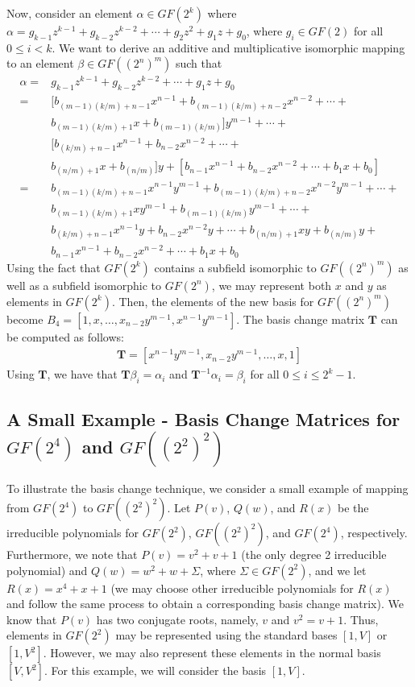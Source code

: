 Now, consider an element $\alpha \in GF(2^k)$ where $\alpha = g_{k-1}z^{k-1} + g_{k-2}z^{k-2} + \dotsb + g_2z^2 + g_1z + g_0$, where $g_i \in GF(2)$ for all $0 \leq i < k$. We want to derive an additive and multiplicative isomorphic mapping to an element $\beta \in GF((2^n)^m)$ such that
\begin{align*}
\alpha = & g_{k-1}z^{k-1} + g_{k-2}z^{k-2} + \dotsb + g_1z + g_0 \\
= & [b_{(m-1)(k/m) + n-1}x^{n-1} + b_{(m-1)(k/m) + n-2}x^{n-2} + \dotsb + \\
& b_{(m-1)(k/m) + 1}x + b_{(m-1)(k/m)}]y^{m-1} + \dotsb + \\
& [b_{(k/m) + n-1}x^{n-1} + b_{n-2}x^{n-2} + \dotsb + \\
& b_{(n/m) + 1}x + b_{(n/m)}]y + [b_{n-1}x^{n-1} + b_{n-2}x^{n-2} + \dotsb + b_{1}x + b_{0}] \\
= & b_{(m-1)(k/m) + n-1}x^{n-1}y^{m-1} + b_{(m-1)(k/m) + n-2}x^{n-2}y^{m-1} + \dotsb + \\
& b_{(m-1)(k/m) + 1}xy^{m-1} + b_{(m-1)(k/m)}y^{m-1} + \dotsb + \\
& b_{(k/m) + n-1}x^{n-1}y + b_{n-2}x^{n-2}y + \dotsb + b_{(n/m) + 1}xy + b_{(n/m)}y + \\
& b_{n-1}x^{n-1} + b_{n-2}x^{n-2} + \dotsb + b_{1}x + b_{0}
\end{align*}
Using the fact that $GF(2^k)$ contains a subfield isomorphic to $GF((2^n)^m)$ as well as a subfield isomorphic to $GF(2^n)$, we may represent both $x$ and $y$ as elements in $GF(2^k)$. Then, the elements of the new basis for $GF((2^n)^m)$ become $B_4 = [1,x,\dots,x_{n-2}y^{m-1},x^{n-1}y^{m-1}]$. The basis change matrix $\mathbf{T}$ can be computed as follows:
\begin{align*}
\mathbf{T} = [x^{n-1}y^{m-1}, x_{n-2}y^{m-1}, \dots, x, 1]
\end{align*}
Using $\mathbf{T}$, we have that $\mathbf{T}\beta_i = \alpha_i$ and $\mathbf{T}^{-1}\alpha_i = \beta_i$ for all $0 \leq i \leq 2^k - 1$.

\subsection{A Small Example - Basis Change Matrices for $GF(2^4)$ and $GF((2^2)^2)$}
To illustrate the basis change technique, we consider a small example of mapping from $GF(2^4)$ to $GF((2^2)^2)$. Let $P(v)$, $Q(w)$, and $R(x)$ be the irreducible polynomials for $GF(2^2)$, $GF((2^2)^2)$, and $GF(2^4)$, respectively. Furthermore, we note that $P(v) = v^2 + v + 1$ (the only degree 2 irreducible polynomial) and $Q(w) = w^2 + w + \Sigma$, where $\Sigma \in GF(2^2)$, and we let $R(x) = x^4 + x + 1$ (we may choose other irreducible polynomials for $R(x)$ and follow the same process to obtain a corresponding basis change matrix). We know that $P(v)$ has two conjugate roots, namely, $v$ and $v^2 = v + 1$. Thus, elements in $GF(2^2)$ may be represented using the standard bases $[1, V]$ or $[1, V^2]$. However, we may also represent these elements in the normal basis $[V, V^2]$. For this example, we will consider the basis $[1,V]$. 

